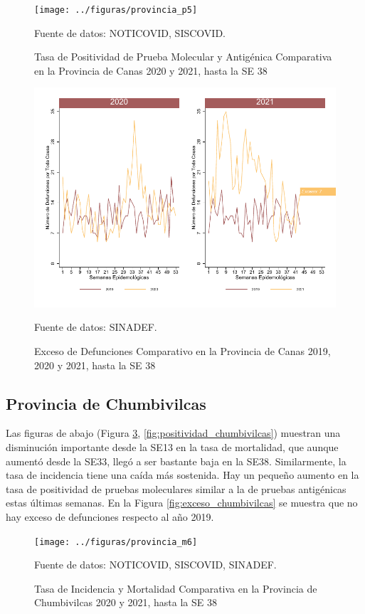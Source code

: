 \documentclass[12pt,a4paper,openany]{book}
\begin{document}
	\begin{figure}[h]
	\caption{Tasa de Positividad de Prueba Molecular y Antigénica Comparativa en la Provincia de Canas 2020 y 2021, hasta la SE 38}\label{fig:positividad_canchis}
	\begin{center}
		\texttt{[image: ../figuras/provincia\_p5]}
	\end{center}
	{\footnotesize {Fuente de datos: NOTICOVID, SISCOVID.}}
	\end{figure}
	
	\begin{figure}[h]
	\caption{Exceso de Defunciones Comparativo en la Provincia de Canas 2019, 2020 y 2021, hasta la SE 38}\label{fig:exceso_canchis}
	\begin{center}
		\includegraphics[width=0.7\linewidth]{../figuras/exceso_5}
	\end{center}
	{\footnotesize {Fuente de datos: SINADEF.}}
	\end{figure}

\clearpage

	\subsection*{Provincia de Chumbivilcas}
	\noindent Las figuras de abajo (Figura \ref{fig:inc_mort_chumbivilcas}, \ref{fig:positividad_chumbivilcas})  muestran una disminución importante desde la SE13 en la tasa de mortalidad, que aunque aumentó desde la SE33, llegó a ser bastante baja en la SE38. Similarmente, la tasa de incidencia tiene una caída más sostenida. Hay un pequeño aumento en la tasa de positividad de pruebas moleculares similar a la de pruebas antigénicas estas últimas semanas. En la Figura \ref{fig:exceso_chumbivilcas} se muestra que no hay exceso de defunciones respecto al año 2019.

	\begin{figure}[h]
	\caption{Tasa de Incidencia y Mortalidad Comparativa en la Provincia de Chumbivilcas 2020 y 2021, hasta la SE 38}\label{fig:inc_mort_chumbivilcas}
	\begin{center}
		\texttt{[image: ../figuras/provincia\_m6]}
	\end{center}
	{\footnotesize {Fuente de datos: NOTICOVID, SISCOVID, SINADEF.}}
	\end{figure}
\end{document}
